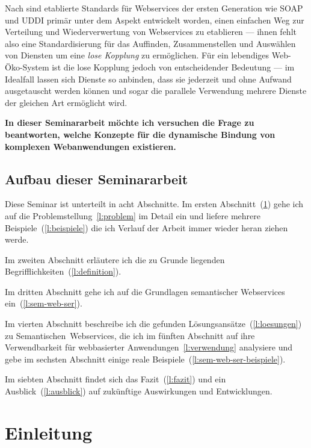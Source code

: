 \documentclass[10pt,a4paper]{article}
\begin{document}
Nach \cite[Seite 653]{ei-sawsdl} sind etablierte Standards für Webservices der ersten Generation wie \acs{SOAP} und \acs{UDDI} primär unter dem Aspekt entwickelt worden, einen einfachen Weg zur Verteilung und Wiederverwertung von Webservices zu etablieren --- ihnen fehlt also eine Standardisierung für das Auffinden, Zusammenstellen und Auswählen von Diensten um eine \emph{lose Kopplung} zu ermöglichen. Für ein lebendiges Web-Öko-System ist die lose Kopplung jedoch von entscheidender Bedeutung --- im Idealfall lassen sich Dienste so anbinden, dass sie jederzeit und ohne Aufwand ausgetauscht werden können und sogar die parallele Verwendung mehrere Dienste der gleichen Art ermöglicht wird.

\textbf{In dieser Seminararbeit möchte ich versuchen die Frage zu beantworten, welche Konzepte für die dynamische Bindung von komplexen Webanwendungen existieren.}

\subsection*{Aufbau dieser Seminararbeit}

Diese Seminar ist unterteilt in acht Abschnitte. Im ersten Abschnitt~(\ref{l:einleitung}) gehe ich auf die Problemstellung~\ref{l:problem} im Detail ein und liefere mehrere Beispiele~(\ref{l:beispiele}) die ich Verlauf der Arbeit immer wieder heran ziehen werde. 

Im zweiten Abschnitt erläutere ich die zu Grunde liegenden Begrifflichkeiten~(\ref{l:definition}). 

Im dritten Abschnitt gehe ich auf die Grundlagen semantischer Webservices ein~(\ref{l:sem-web-ser}).

Im vierten Abschnitt beschreibe ich die gefunden Lösungsansätze~(\ref{l:loesungen}) zu Semantischen~Webservices, die ich im fünften Abschnitt auf ihre Verwendbarkeit für webbasierter Anwendungen~\ref{l:verwendung} analysiere und gebe im sechsten Abschnitt einige reale Beispiele~(\ref{l:sem-web-ser-beispiele}).

Im siebten Abschnitt findet sich das Fazit~(\ref{l:fazit}) und ein Ausblick~(\ref{l:ausblick}) auf zukünftige Auswirkungen und Entwicklungen.

\pagebreak

\tableofcontents

\pagebreak
\section{Einleitung}
\label{l:einleitung}
\end{document}
